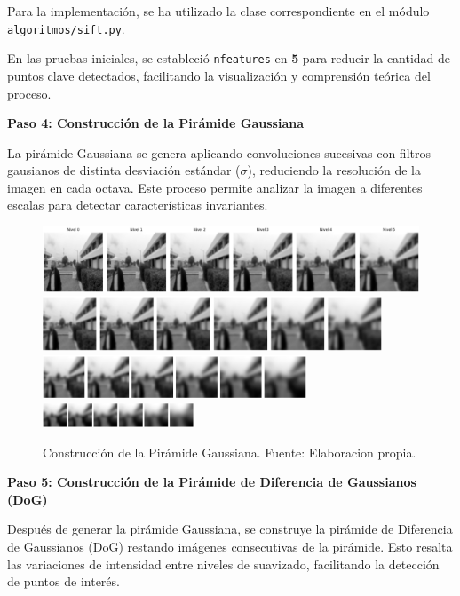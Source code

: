 \documentclass[a4paper]{article}
\begin{document}
Para la implementación, se ha utilizado la clase correspondiente en el módulo \texttt{algoritmos/sift.py}. 
\par\vspace{0.5cm}
En las pruebas iniciales, se estableció \texttt{nfeatures} en \textbf{5} para reducir la cantidad de puntos clave detectados, 
facilitando la visualización y comprensión teórica del proceso.
\par\vspace{0.5cm}

\textbf{Paso 4: Construcción de la Pirámide Gaussiana}
\par\vspace{0.5cm}

La pirámide Gaussiana se genera aplicando convoluciones sucesivas con filtros gausianos de distinta desviación estándar (\(\sigma\)), reduciendo la resolución de la imagen en cada octava. Este proceso permite analizar la imagen a diferentes escalas para detectar características invariantes.

\begin{figure}[H]
    \centering
    \includegraphics[width=1.1\textwidth]{images/sift_paso_3.1.png}
    \includegraphics[width=0.9\textwidth]{images/sift_paso_3.2.png}
    \includegraphics[width=0.7\textwidth]{images/sift_paso_3.3.png}
    \includegraphics[width=0.4\textwidth]{images/sift_paso_3.4.png}
    \caption{Construcción de la Pirámide Gaussiana. Fuente: Elaboracion propia.}
\end{figure}

\textbf{Paso 5: Construcción de la Pirámide de Diferencia de Gaussianos (DoG)}

Después de generar la pirámide Gaussiana, se construye la pirámide de Diferencia de Gaussianos (DoG) restando imágenes consecutivas de la pirámide. Esto resalta las variaciones de intensidad entre niveles de suavizado, facilitando la detección de puntos de interés.
\end{document}
